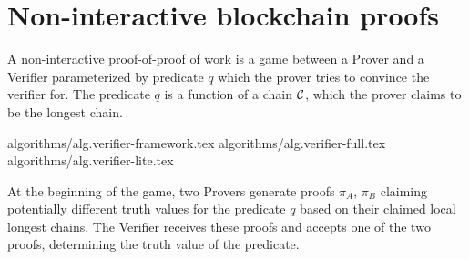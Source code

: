 \section{Non-interactive blockchain proofs}

A non-interactive proof-of-proof of work is a game between a Prover and a
Verifier parameterized by predicate $q$ which the prover tries to convince the
verifier for. The predicate $q$ is a function of a chain $\mathcal{C}$, which the
prover claims to be the longest chain.

{algorithms/alg.verifier-framework.tex}
{algorithms/alg.verifier-full.tex}
{algorithms/alg.verifier-lite.tex}

At the beginning of the game, two Provers generate proofs $\pi_A$, $\pi_B$
claiming potentially different truth values for the predicate $q$ based on
their claimed local longest chains. The Verifier receives these proofs and
accepts one of the two proofs, determining the truth value of the predicate.
